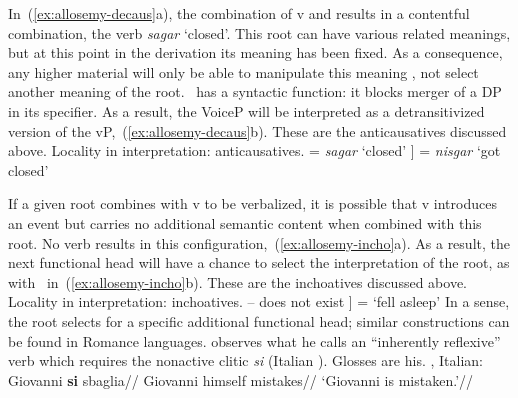 In~(\ref{ex:allosemy-decaus}a), the combination of v and  results in a contentful combination, the verb \emph{sagar} `closed'. This root can have various related meanings, but at this point in the derivation its meaning has been fixed. As a consequence, any higher material will only be able to manipulate this meaning \citep{arad03}, not select another meaning of the root. \vz~has a syntactic function: it blocks merger of a DP in its specifier. As a result, the VoiceP will be interpreted as a detransitivized version of the vP,~(\ref{ex:allosemy-decaus}b). These are the anticausatives discussed above.
\pex Locality in interpretation: anticausatives.\label{ex:allosemy-decaus}
    \a {} = \emph{sagar} `closed'
    \a {[} \fbox{\textbf{\vz}}  ] = \emph{nisgar} `got closed'
\xe

If a given root combines with v to be verbalized, it is possible that v introduces an event but carries no additional semantic content when combined with this root. No verb results in this configuration,~(\ref{ex:allosemy-incho}a). As a result, the next functional head will have a chance to select the interpretation of the root, as with \vz~in~(\ref{ex:allosemy-incho}b). These are the inchoatives discussed above.
\pex Locality in interpretation: inchoatives.\label{ex:allosemy-incho}
    \a {} -- does not exist
    \a {[} \fbox{\textbf{\vz}}  ] = `fell asleep'
\xe
In a sense, the root selects for a specific additional functional head; similar constructions can be found in Romance languages. \cite{burzio86} observes what he calls an ``inherently reflexive'' verb which requires the nonactive clitic \emph{si} (Italian ). Glosses are his.
\pex \citet[39]{burzio86}, Italian:
	\a \begingl
		\gla Giovanni \textbf{si} sbaglia//
		\glb Giovanni himself mistakes//
		\glft `Giovanni is mistaken.'//
	\endgl
	
